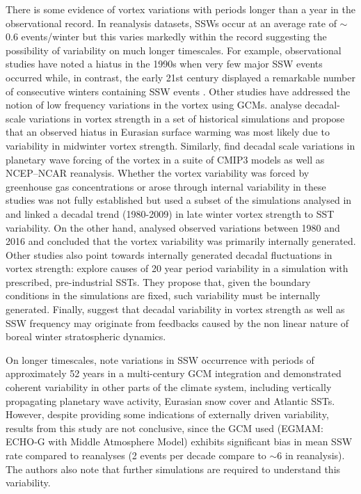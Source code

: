 There is some evidence of vortex variations with periods longer than a year in the observational record. In reanalysis datasets, SSWs occur at an average rate of $\sim$0.6 events/winter but this varies markedly within the record \citep{butlerDefining2015b} suggesting the possibility of variability on much longer timescales. For example, observational studies have noted a hiatus in the 1990s when very few major SSW events occurred \citep{butlerDefining2015b,pawsonCold1999b, Shindell1999} while, in contrast, the early 21st century displayed a remarkable number of consecutive winters containing SSW events \citep{manneyRemarkable2005}. Other studies have addressed the notion of low frequency variations in the vortex using GCMs. \cite{garfinkelStratospheric2017b} analyse decadal-scale variations in vortex strength in a set of historical simulations and propose that an observed hiatus in Eurasian surface warming was most likely due to variability in midwinter vortex strength. Similarly, \cite{cohenDecadal2009b} find decadal scale variations in planetary wave forcing of the vortex in a suite of CMIP3 models as well as NCEP–NCAR reanalysis. Whether the vortex variability was forced by greenhouse gas concentrations or arose through internal variability in these studies was not fully established but \cite{garfinkelEffect2015b} used a subset of the simulations analysed in \cite{garfinkelStratospheric2017b} and linked a decadal trend (1980-2009) in late winter vortex strength to SST variability. On the other hand, \cite{Seviour2017} analysed observed variations between 1980 and 2016 and concluded that the vortex variability was primarily internally generated. Other studies also point towards internally generated decadal fluctuations in vortex strength: \cite{manziniStratospheretroposphere2012b} explore causes of 20 year period variability in a simulation with prescribed, pre-industrial SSTs. They propose that, given the boundary conditions in the simulations are fixed, such variability must be internally generated. Finally, \cite{Butchart2000} suggest that decadal variability in vortex strength as well as SSW frequency may originate from feedbacks caused by the non linear nature of boreal winter stratospheric dynamics.

On longer timescales, \cite{schimankeMultidecadal2011b} note variations in SSW occurrence with periods of approximately 52 years in a multi-century GCM integration and demonstrated coherent variability in other parts of the climate system, including vertically propagating planetary wave activity, Eurasian snow cover and Atlantic SSTs. However, despite providing some indications of externally driven variability, results from this study are not conclusive, since the GCM used (EGMAM: ECHO‐G with Middle Atmosphere Model) exhibits significant bias in mean SSW rate compared to reanalyses (2 events per decade compare to $\sim$6 in reanalysis). The authors also note that further simulations are required to understand this variability. 


